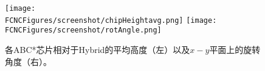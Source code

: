 \begin{figure}[H]
\centering
\texttt{[image: \\FCNCFigures/screenshot/chipHeightavg.png]}
\texttt{[image: \\FCNCFigures/screenshot/rotAngle.png]}
\caption{各ABC*芯片相对于Hybrid的平均高度（左）以及$x-y$平面上的旋转角度（右）。}
\label{fig:rotAngle}
\end{figure}